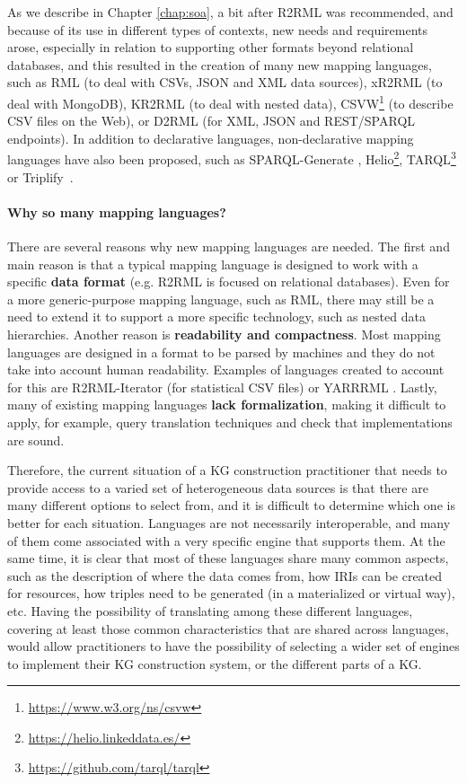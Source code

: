 As we describe in Chapter \ref{chap:soa}, a bit after R2RML was recommended, and because of its use in different types of contexts, new needs and requirements arose, especially in relation to supporting other formats beyond relational databases, and this resulted in the creation of many new mapping languages, such as RML \citep{dimou2014rml} (to deal with CSVs, JSON and XML data sources), xR2RML \citep{michel2015translation} (to deal with MongoDB), KR2RML \citep{slepicka2015kr2rml} (to deal with nested data), CSVW\footnote{\url{https://www.w3.org/ns/csvw}} (to describe CSV files on the Web), or D2RML \citep{chortaras2018d2rml} (for XML, JSON and REST/SPARQL endpoints). In addition to declarative languages, non-declarative mapping languages have also been proposed, such as SPARQL-Generate \citep{lefranccois2017sparql}, Helio\footnote{\url{https://helio.linkeddata.es/}},  TARQL\footnote{\url{https://github.com/tarql/tarql}} or Triplify~\citep{auer2009triplify}.

\noindent\paragraph{\textbf{Why so many mapping languages?}}
There are several reasons why new mapping languages are needed. The first and main reason is that a typical mapping language is designed to work with a specific \textbf{data format} (e.g. R2RML is focused on relational databases). Even for a more generic-purpose mapping language, such as RML, there may still be a need to extend it to support a more specific technology, such as nested data hierarchies. Another reason is \textbf{readability and compactness}. Most mapping languages are designed in a format to be parsed by machines and they do not take into account human readability. Examples of languages created to account for this are R2RML-Iterator (for statistical CSV files) \citep{chaves2018virtual} or YARRRML \citep{Heyvaert2018Declarative}. Lastly, many of existing mapping languages \textbf{lack formalization}, making it difficult to apply, for example, query translation techniques and check that implementations are sound. 

Therefore, the current situation of a KG construction practitioner that needs to provide access to a varied set of heterogeneous data sources is that there are many different options to select from, and it is difficult to determine which one is better for each situation. Languages are not necessarily interoperable, and many of them come associated with a very specific engine that supports them. At the same time, it is clear that most of these languages share many common aspects, such as the description of where the data comes from, how IRIs can be created for resources, how triples need to be generated (in a materialized or virtual way), etc. Having the possibility of translating among these different languages, covering at least those common characteristics that are shared across languages, would allow practitioners to have the possibility of selecting a wider set of engines to implement their KG construction system, or the different parts of a KG.

